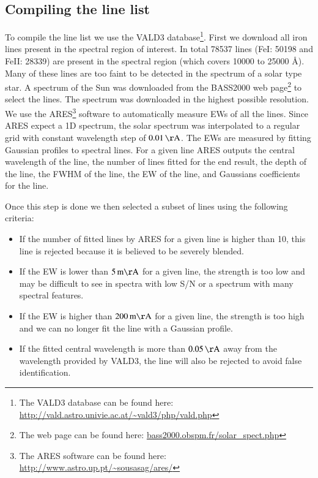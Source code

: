 \documentclass{aa}
\begin{document}
\subsection{Compiling the line list}

To compile the line list we use the VALD3
database\footnote{The VALD3 database can be found here:
\url{http://vald.astro.univie.ac.at/~vald3/php/vald.php}}. First we
download all iron lines present in the spectral region of interest.
In total 78537 lines (FeI: 50198 and FeII: 28339) are present in
the spectral region (which covers 10000 to 25000 \si{\angstrom}).
Many of these lines are too faint to be detected in the spectrum
of a solar type star. A spectrum of the Sun was downloaded from
the BASS2000 web page\footnote{The web page can be found here:
\url{bass2000.obspm.fr/solar_spect.php}} to select the lines.
The spectrum was downloaded in the highest possible resolution.
We use the ARES\footnote{The ARES software can be found here:
\url{http://www.astro.up.pt/~sousasag/ares/}}\citep{Sousa2007,Sousa2015a}
software to automatically measure EWs of all the lines. Since ARES
expect a 1D spectrum, the solar spectrum was interpolated to a regular
grid with constant wavelength step of $\SI{0.01}{\AA}$. The EWs are
measured by fitting Gaussian profiles to spectral lines. For a given
line ARES outputs the central wavelength of the line, the number of
lines fitted for the end result, the depth of the line, the FWHM of the
line, the EW of the line, and Gaussians coefficients for the line.

Once this step is done we then selected a subset of lines using the following
criteria:
\begin{itemize}
    \item If the number of fitted lines by ARES for a given line is higher than 10,
        this line is rejected because it is believed to be severely blended.
    \item If the EW is lower than $\SI{5}{m\AA}$ for a given line, the strength
        is too low and may be difficult to see in spectra with low S/N or a
        spectrum with many spectral features.
    \item If the EW is higher than $\SI{200}{m\AA}$ for a given line, the strength
        is too high and we can no longer fit the line with a Gaussian profile.
    \item If the fitted central wavelength is more than $\SI{0.05}{\AA}$ away
        from the wavelength provided by VALD3, the line will also be rejected to
        avoid false identification.
\end{itemize}
\end{document}

